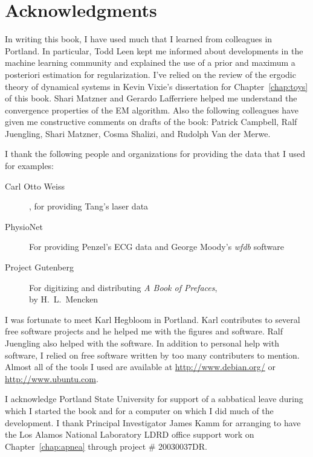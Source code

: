 \documentclass[]{hmmdsbook}
\begin{document}
\section*{Acknowledgments}
%
\label{sec:ack}
\longpage%

In writing this book, I have used much that I learned from
colleagues in Portland.  In particular, Todd Leen kept me informed
about developments in the machine learning community and explained the
use of a prior and maximum a posteriori estimation for regularization.
I've relied on the review of the ergodic theory of dynamical systems
in Kevin Vixie's dissertation\cite{vixie02} for
Chapter~\ref{chap:toys} of this book.  Shari Matzner and Gerardo
Lafferriere helped me understand the convergence properties of the EM
algorithm.  Also the following colleagues have given me constructive
comments on drafts of the book:
% 
Patrick Campbell, %
Ralf Juengling, %
Shari Matzner, %
Cosma Shalizi, %
and %
Rudolph Van der Merwe. %

I thank the following people and organizations for providing the data
that I used for examples:
\begin{description}
\item[Carl Otto Weiss], for providing Tang's\cite{Tang92} laser data
\item[PhysioNet] For providing Penzel's\cite{Penzel02} ECG data and
  George Moody's \emph{wfdb} software \cite{PhysioToolkit}
\item[Project Gutenberg] For digitizing and distributing \emph{A
    Book of Prefaces},\\ by H.~L.~Mencken
\end{description}

I was fortunate to meet Karl Hegbloom in Portland.  Karl contributes
to several free software projects and he helped me with the figures
and software.  Ralf Juengling also helped with the software.  In
addition to personal help with software, I relied on free software
written by too many contributers to mention.  Almost all of the tools
I used are available at \url{http://www.debian.org/} or
\url{http://www.ubuntu.com}.

I acknowledge Portland State University for support of a sabbatical
leave during which I started the book and for a computer on which I
did much of the development.  I thank Principal Investigator James
Kamm for arranging to have the Los Alamos National Laboratory LDRD
office support work on Chapter~\ref{chap:apnea} through project \#
20030037DR.
%
\end{document}
